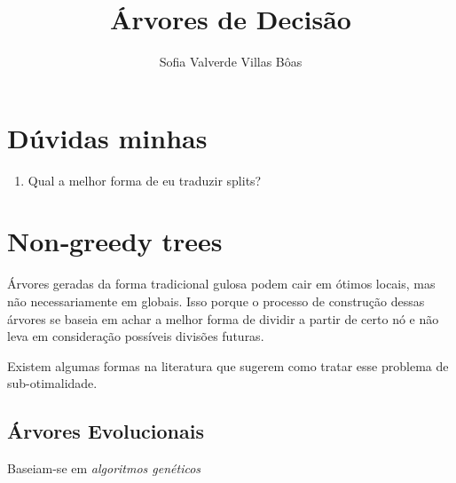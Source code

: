 \documentclass[12pt,a4paper]{article}
\title{\textbf{Árvores de Decisão}}
\author{Sofia Valverde Villas Bôas}
\date{}
\begin{document}
\maketitle

\section{Dúvidas minhas}

\begin{enumerate}
    \item Qual a melhor forma de eu traduzir splits?
\end{enumerate}

\section{Non‑greedy trees}

Árvores geradas da forma tradicional gulosa podem cair em ótimos locais, mas não necessariamente em globais. Isso porque o processo de construção dessas árvores se baseia em achar a melhor forma de dividir a partir de certo nó e não leva em consideração possíveis divisões futuras.

Existem algumas formas na literatura que sugerem como tratar esse problema de sub-otimalidade.

\subsection{Árvores Evolucionais}

Baseiam-se em \emph{algoritmos genéticos}




\begingroup
\onehalfspacing
\printbibliography
\endgroup
\end{document}

